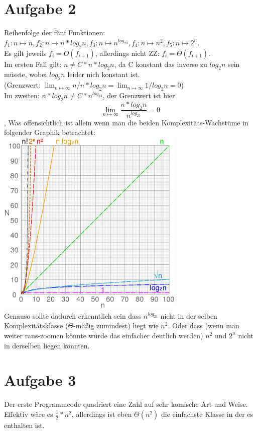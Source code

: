\documentclass{scrartcl}
\begin{document}
\section*{Aufgabe 2}
Reihenfolge der fünf Funktionen: $f_1: n \mapsto n, f_2: n \mapsto n * log_2n, f_3: n \mapsto n^{log_23}, f_4: n \mapsto n^2, f_5: n \mapsto 2^n $. \\
Es gilt jeweils $f_i = O(f_{i + 1})$, allerdings nicht ZZ: $f_i = \Theta(f_{i+1})$. \\
Im ersten Fall gilt: $ n \neq C * n * log_2n$, da C konstant das inverse zu $log_2n$ sein müsste, wobei $log_2n$ leider nich konstant ist. \\
(Grenzwert: $\lim_{n \mapsto \infty}{n / n * log_2n} = \lim_{n \mapsto \infty}{1 / log_2n} = 0$) \\
Im zweiten: $ n * log_2n \neq C * n^{log_23}$, der Grenzwert ist hier $$\lim_{n \mapsto \infty}{\frac{n * log_2n}{n^{log_23}}} = 0$$,
Was offensichtlich ist allein wenn man die beiden Komplexitäts-Wachstüme in folgender Graphik betrachtet: \\
\includegraphics[width=9cm]{comp3.png} \\
Genauso sollte dadurch erkenntlich sein dass $n^{log_23}$ nicht in der selben Komplexitätsklasse ($\Theta$-mäßig zumindest) liegt wie $n^2$.
Oder dass (wenn man weiter raus-zoomen könnte würde das einfacher deutlich werden) $n^2$ und $2^n$ nicht in derselben liegen könnten.


\section*{Aufgabe 3}
Der erste Programmcode quadriert eine Zahl auf sehr komische Art und Weise. Effektiv wäre es $\frac12*n^2$, allerdings ist
eben $\Theta(n^2)$ die einfachste Klasse in der es enthalten ist. \\ \\
\end{document}
